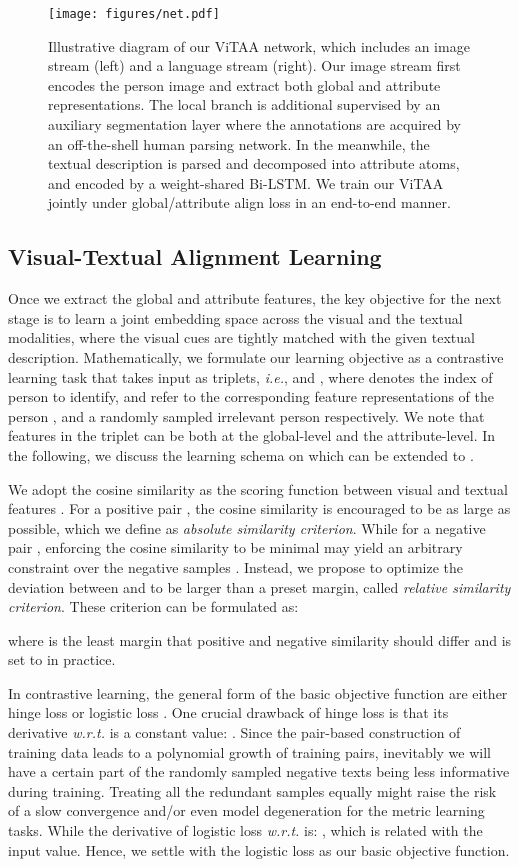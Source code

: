 \documentclass[runningheads]{llncs}
\begin{document}
\begin{figure*}[t!]
\centering
\texttt{[image: figures/net.pdf]}
\caption{Illustrative diagram of our ViTAA network, which includes an image stream (left) and a language stream (right). Our image stream first encodes the person image and extract both global and attribute representations. The local branch is additional supervised by an auxiliary segmentation layer where the annotations are acquired by an off-the-shell human parsing network. 
In the meanwhile, the textual description is parsed and decomposed into attribute atoms, and encoded by a weight-shared Bi-LSTM. We train our ViTAA jointly under global/attribute align loss in an end-to-end manner.}
\label{fig:architecture}
\end{figure*}

\subsection{Visual-Textual Alignment Learning}
Once we extract the global and attribute features, the key objective for the next stage is to learn a joint embedding space across the visual and the textual modalities, where the visual cues are tightly matched with the given textual description. 
Mathematically, we formulate our learning objective as a contrastive learning task that takes input as triplets, \textit{i.e.},  and , where  denotes the index of person to identify, and  refer to the corresponding feature representations of the person , and a randomly sampled irrelevant person respectively.
We note that features in the triplet can be both at the global-level and the attribute-level. In the following, we discuss the learning schema on  which can be extended to .

We adopt the cosine similarity as the scoring function between visual and textual features . For a positive pair , the cosine similarity  is encouraged to be as large as possible, which we define as \emph{absolute similarity criterion}. While for a negative pair , enforcing the cosine similarity  to be minimal may yield an arbitrary constraint over the negative samples . Instead, we propose to optimize the deviation between  and  to be larger than a preset margin, called \emph{relative similarity criterion}. These criterion can be formulated as:

where  is the least margin that positive and negative similarity should differ and is set to  in practice.

In contrastive learning, the general form of the basic objective function are either hinge loss  or logistic loss . One crucial drawback of hinge loss is that its derivative \textit{w.r.t.}  is a constant value: . Since the pair-based construction of training data leads to a polynomial growth of training pairs, inevitably we will have a certain part of the randomly sampled negative texts being less informative during training. Treating all the redundant samples equally might raise the risk of a slow convergence and/or even model degeneration for the metric learning tasks. While the derivative of logistic loss \textit{w.r.t.}  is: , which is related with the input value. Hence, we settle with the logistic loss as our basic objective function.
\end{document}
